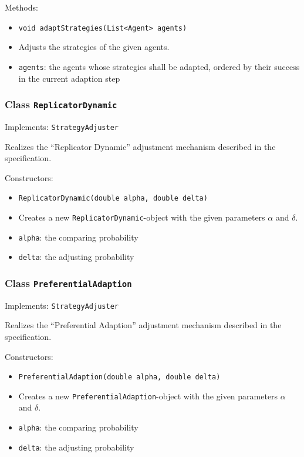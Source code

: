 \documentclass[parskip=full,11pt]{scrartcl}
\begin{document}
Methods:
\begin{itemize}\itemsep -10pt
\item \texttt{void adaptStrategies(List<Agent> agents)}
\item[] Adjusts the strategies of the given agents.
\item[] \texttt{agents}: the agents whose strategies shall be adapted, ordered by their success in the current adaption step
\end{itemize}

\subsubsection{Class \texttt{ReplicatorDynamic}}
Implements: \texttt{StrategyAdjuster}

Realizes the \enquote{Replicator Dynamic} adjustment mechanism described in the specification.

Constructors:
\begin{itemize}\itemsep -10pt
\item \texttt{ReplicatorDynamic(double alpha, double delta)}
\item[] Creates a new \texttt{ReplicatorDynamic}-object with the given parameters \(\alpha\) and \(\delta\).
\item[] \texttt{alpha}: the comparing probability
\item[] \texttt{delta}: the adjusting probability
\end{itemize}

\subsubsection{Class \texttt{PreferentialAdaption}}
Implements: \texttt{StrategyAdjuster}

Realizes the \enquote{Preferential Adaption} adjustment mechanism described in the specification.

Constructors:
\begin{itemize}\itemsep -10pt
\item \texttt{PreferentialAdaption(double alpha, double delta)}
\item[] Creates a new \texttt{PreferentialAdaption}-object with the given parameters \(\alpha\) and \(\delta\).
\item[] \texttt{alpha}: the comparing probability
\item[] \texttt{delta}: the adjusting probability
\end{itemize}
\end{document}

